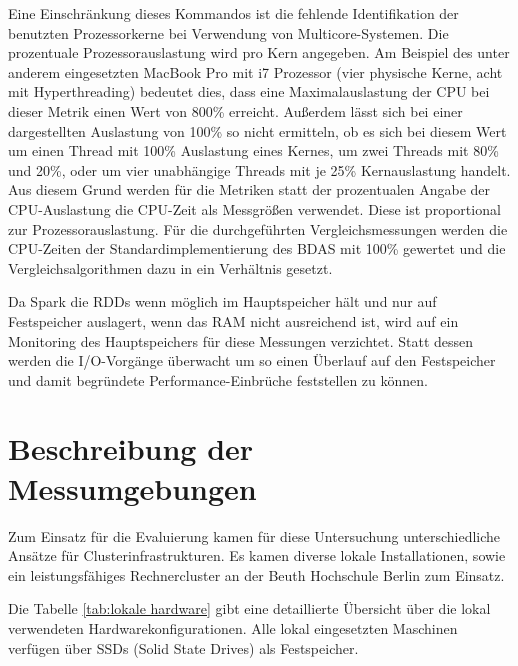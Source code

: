 Eine Einschränkung dieses Kommandos ist die fehlende Identifikation der benutzten Prozessorkerne bei Verwendung von Multicore-Systemen. Die prozentuale Prozessorauslastung wird pro Kern angegeben. Am Beispiel des unter anderem eingesetzten MacBook Pro mit i7 Prozessor (vier physische Kerne, acht mit Hyperthreading) bedeutet dies, dass eine Maximalauslastung der CPU bei dieser Metrik einen Wert von 800\% erreicht. Außerdem lässt sich bei einer dargestellten Auslastung von 100\% so nicht ermitteln, ob es sich bei diesem Wert um einen Thread mit 100\% Auslastung eines Kernes, um zwei Threads mit 80\% und 20\%, oder um vier unabhängige Threads mit je 25\% Kernauslastung handelt. Aus diesem Grund werden für die Metriken statt der prozentualen Angabe der CPU-Auslastung die CPU-Zeit als Messgrößen verwendet. Diese ist proportional zur Prozessorauslastung. Für die durchgeführten Vergleichsmessungen werden die CPU-Zeiten der Standardimplementierung des BDAS mit 100\% gewertet und die Vergleichsalgorithmen dazu in ein Verhältnis gesetzt.  

Da Spark die RDDs wenn möglich im Hauptspeicher hält und nur auf Festspeicher auslagert, wenn das RAM nicht ausreichend ist, wird auf ein Monitoring des Hauptspeichers für diese Messungen verzichtet. Statt dessen werden die I/O-Vorgänge überwacht um so einen Überlauf auf den Festspeicher und damit begründete Performance-Einbrüche feststellen zu können. 

\section{Beschreibung der Messumgebungen}
\label{section:messumgebungen}

Zum Einsatz für die Evaluierung kamen für diese Untersuchung unterschiedliche Ansätze für Clusterinfrastrukturen. Es kamen diverse lokale Installationen, sowie ein leistungsfähiges Rechnercluster an der Beuth Hochschule Berlin zum Einsatz.  

Die Tabelle \ref{tab:lokale hardware} gibt eine detaillierte Übersicht über die lokal verwendeten Hardwarekonfigurationen. Alle lokal eingesetzten Maschinen verfügen über SSDs (Solid State Drives) als Festspeicher.

